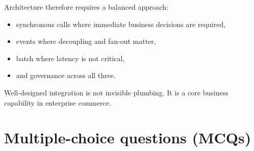 Architecture therefore requires a balanced approach:
\begin{itemize}
  \item synchronous calls where immediate business decisions are required,
  \item events where decoupling and fan-out matter,
  \item batch where latency is not critical,
  \item and governance across all three.
\end{itemize}

Well-designed integration is not invisible plumbing.
It is a core business capability in enterprise commerce.

\section{Multiple-choice questions (MCQs)}
